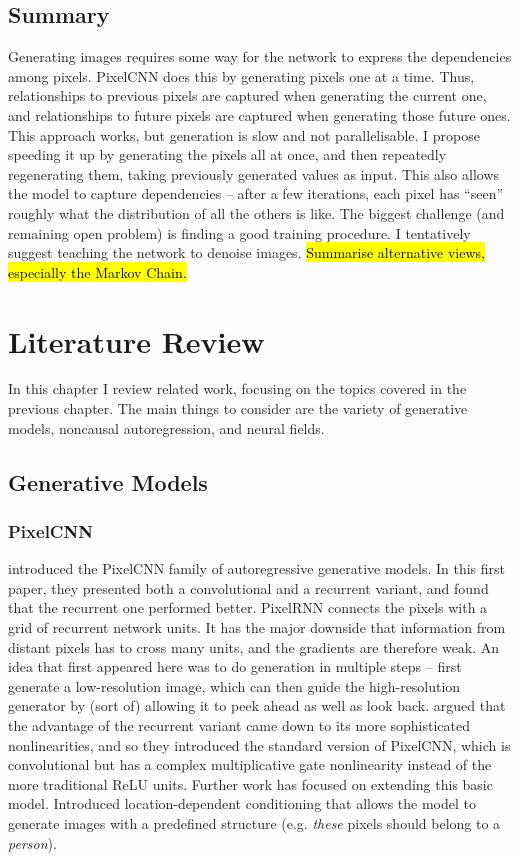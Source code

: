 \documentclass[11pt, a4paper, openany]{book}
\newcommand{\nquote}[1]{``{#1}''}
\begin{document}
\section{Summary}
Generating images requires some way for the network to express the dependencies among pixels. PixelCNN does this by generating pixels one at a time. Thus, relationships to previous pixels are captured when generating the current one, and relationships to future pixels are captured when generating those future ones. This approach works, but generation is slow and not parallelisable. I propose speeding it up by generating the pixels all at once, and then repeatedly regenerating them, taking previously generated values as input. This also allows the model to capture dependencies -- after a few iterations, each pixel has \nquote{seen} roughly what the distribution of all the others is like. The biggest challenge (and remaining open problem) is finding a good training procedure. I tentatively suggest teaching the network to denoise images. \hl{Summarise alternative views, especially the Markov Chain.}


\chapter{Literature Review}
\label{cha:review}

In this chapter I review related work, focusing on the topics covered in the previous chapter. The main things to consider are the variety of generative models, noncausal autoregression, and neural fields.

\section{Generative Models}

\subsection{PixelCNN}
 introduced the PixelCNN family of autoregressive generative models. In this first paper, they presented both a convolutional and a recurrent variant, and found that the recurrent one performed better. PixelRNN connects the pixels with a grid of recurrent network units. It has the major downside that information from distant pixels has to cross many units, and the gradients are therefore weak. An idea that first appeared here was to do generation in multiple steps -- first generate a low-resolution image, which can then guide the high-resolution generator by (sort of) allowing it to peek ahead as well as look back.  argued that the advantage of the recurrent variant came down to its more sophisticated nonlinearities, and so they introduced the standard version of PixelCNN, which is convolutional but has a complex multiplicative gate nonlinearity instead of the more traditional ReLU units. Further work has focused on extending this basic model. \citet{pixelcnn3} Introduced location-dependent conditioning that allows the model to generate images with a predefined structure (e.g. \emph{these} pixels should belong to a \emph{person}).
\end{document}
